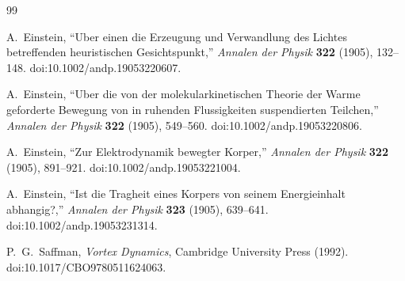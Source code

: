 \begin{thebibliography}{99}

A.~Einstein,
``Uber einen die Erzeugung und Verwandlung des Lichtes betreffenden heuristischen Gesichtspunkt,''
\emph{Annalen der Physik} \textbf{322} (1905), 132--148.
doi:10.1002/andp.19053220607.

A.~Einstein,
``Uber die von der molekularkinetischen Theorie der Warme geforderte Bewegung von in ruhenden Flussigkeiten suspendierten Teilchen,''
\emph{Annalen der Physik} \textbf{322} (1905), 549--560.
doi:10.1002/andp.19053220806.

A.~Einstein,
``Zur Elektrodynamik bewegter Korper,''
\emph{Annalen der Physik} \textbf{322} (1905), 891--921.
doi:10.1002/andp.19053221004.

A.~Einstein,
``Ist die Tragheit eines Korpers von seinem Energieinhalt abhangig?,''
\emph{Annalen der Physik} \textbf{323} (1905), 639--641.
doi:10.1002/andp.19053231314.

P.~G.~Saffman,
\emph{Vortex Dynamics},
Cambridge University Press (1992).
doi:10.1017/CBO9780511624063.

\end{thebibliography}
